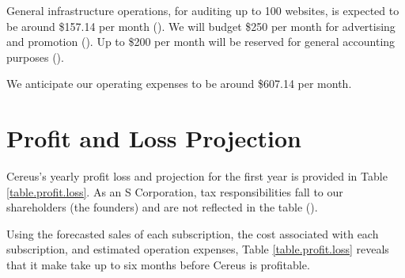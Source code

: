 General infrastructure operations, for auditing up to 100 websites, is expected to be around \$157.14 per month (). We will budget \$250 per month for advertising and promotion (). Up to \$200 per month will be reserved for general accounting purposes ().

We anticipate our operating expenses to be around \$607.14 per month.

\section{Profit and Loss Projection}

Cereus's yearly profit loss and projection for the first year is provided in Table \ref{table.profit.loss}. As an S Corporation, tax responsibilities fall to our shareholders (the founders) and are not reflected in the table ().

Using the forecasted sales of each subscription, the cost associated with each subscription, and estimated operation expenses, Table \ref{table.profit.loss} reveals that it make take up to six months before Cereus is profitable.

